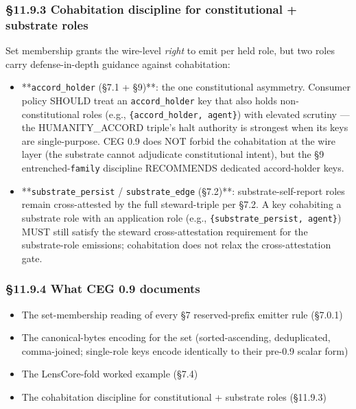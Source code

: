 \documentclass[10pt]{article}
\begin{document}
\subsubsection*{§11.9.3 Cohabitation discipline for constitutional + substrate roles}


Set membership grants the wire-level \textit{right} to emit per held role, but two roles carry defense-in-depth guidance against cohabitation:


\begin{itemize}\setlength\itemsep{0pt}
\item **\texttt{accord\_holder} (§7.1 + §9)**: the one constitutional asymmetry. Consumer policy SHOULD treat an \texttt{accord\_holder} key that also holds non-constitutional roles (e.g., \texttt{\{accord\_holder, agent\}}) with elevated scrutiny — the HUMANITY\_ACCORD triple's halt authority is strongest when its keys are single-purpose. CEG 0.9 does NOT forbid the cohabitation at the wire layer (the substrate cannot adjudicate constitutional intent), but the §9 entrenched-\texttt{family} discipline RECOMMENDS dedicated accord-holder keys.
\item **\texttt{substrate\_persist} / \texttt{substrate\_edge} (§7.2)**: substrate-self-report roles remain cross-attested by the full steward-triple per §7.2. A key cohabiting a substrate role with an application role (e.g., \texttt{\{substrate\_persist, agent\}}) MUST still satisfy the steward cross-attestation requirement for the substrate-role emissions; cohabitation does not relax the cross-attestation gate.
\end{itemize}


\subsubsection*{§11.9.4 What CEG 0.9 documents}


\begin{itemize}\setlength\itemsep{0pt}
\item The set-membership reading of every §7 reserved-prefix emitter rule (§7.0.1)
\item The canonical-bytes encoding for the set (sorted-ascending, deduplicated, comma-joined; single-role keys encode identically to their pre-0.9 scalar form)
\item The LensCore-fold worked example (§7.4)
\item The cohabitation discipline for constitutional + substrate roles (§11.9.3)
\end{itemize}
\end{document}
